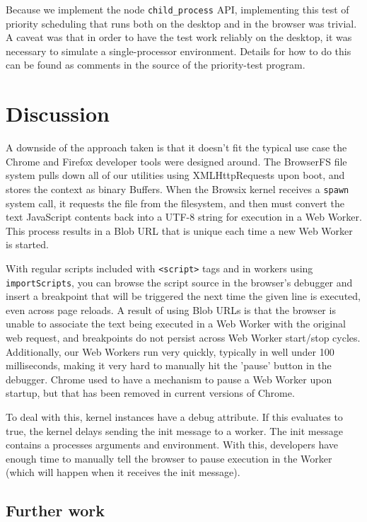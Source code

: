 \documentclass{acm_proc_article-sp}
\begin{document}
Because we implement the node \texttt{child\_process} API,
implementing this test of priority scheduling that runs both on the
desktop and in the browser was trivial.  A caveat was that in order to
have the test work reliably on the desktop, it was necessary to
simulate a single-processor environment.  Details for how to do this
can be found as comments in the source of the priority-test program.

\section{Discussion}

A downside of the approach taken is that it doesn't fit the typical
use case the Chrome and Firefox developer tools were designed around.
The BrowserFS file system pulls down all of our utilities using
XMLHttpRequests upon boot, and stores the context as binary Buffers.
When the Browsix kernel receives a \texttt{spawn} system call, it
requests the file from the filesystem, and then must convert the text
JavaScript contents back into a UTF-8 string for execution in a Web
Worker.  This process results in a Blob URL that is unique each time a
new Web Worker is started.

With regular scripts included with \texttt{<script>} tags and in
workers using \texttt{importScripts}, you can browse the script source
in the browser's debugger and insert a breakpoint that will be
triggered the next time the given line is executed, even across page
reloads.  A result of using Blob URLs is that the browser is unable to
associate the text being executed in a Web Worker with the original
web request, and breakpoints do not persist across Web Worker
start/stop cycles.  Additionally, our Web Workers run very quickly,
typically in well under 100 milliseconds, making it very hard to
manually hit the 'pause' button in the debugger.  Chrome used to have
a mechanism to pause a Web Worker upon startup, but that has been
removed in current versions of Chrome.

To deal with this, kernel instances have a debug attribute.  If this
evaluates to true, the kernel delays sending the init message to a
worker.  The init message contains a processes arguments and
environment.  With this, developers have enough time to manually tell
the browser to pause execution in the Worker (which will happen when
it receives the init message).

\subsection{Further work}
\end{document}
